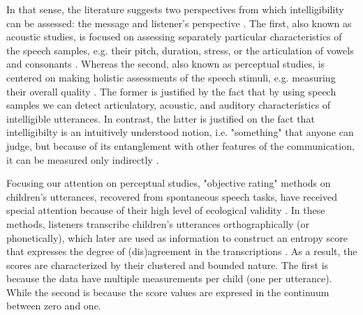 In that sense, the literature suggests two perspectives from which intelligibility can be assessed: the message and listener’s perspective \citep{Boonen_et_al_2020, Boonen_et_al_2021}. The first, also known as acoustic studies, is focused on assessing separately particular characteristics of the speech samples, e.g. their pitch, duration, stress, or the articulation of vowels and consonants \citep{Rowe_et_al_2018}. Whereas the second, also known as perceptual studies, is centered on making holistic assessments of the speech stimuli, e.g. measuring their overall quality \citep{Boonen_et_al_2020, Boonen_et_al_2021}. The former is justified by the fact that by using speech samples we can detect articulatory, acoustic, and auditory characteristics of intelligible utterances. In contrast, the latter is justified on the fact that intelligibilty is an intuitively understood notion, i.e. "something" that anyone can judge, but because of its entanglement with other features of the communication, it can be measured only indirectly \citep{Guilford_1954, Stevens_1946}.

\begin{comment}	
	
	On both instances, the stimuli (children's utterances) can be generated from reading at loud, contextualized utterances, or spontaneous speech tasks\footnote{ordered on increasing level of ecological validity \citep{Flipsen_2006, Ertmer_2011}}.
	
	Based on their description, it seems that perceptual are more subjective than acoustic studies, as they do not rely on "objective" measurements, i.e. time duration, wave amplitude, among others, available in the former. However, for the case of SI, there are objective and subjective assessment methodologies.
		
\end{comment}

Focusing our attention on perceptual studies, "objective rating" methods on children's utterances, recovered from spontaneous speech tasks, have received special attention because of their high level of ecological validity \citep{Boonen_et_al_2021, Ertmer_2011, Flipsen_2006, Hustad_et_al_2020}. In these methods, listeners transcribe children's utterances orthographically (or phonetically), which later are used as information to construct an entropy score that expresses the degree of (dis)agreement in the transcriptions \citep{Boonen_et_al_2021, Shannon_1948}. As a result, the scores are characterized by their clustered and bounded nature. The first is because the data have multiple measurements per child (one per utterance). While the second is because the score values are expresed in the continuum between zero and one.

